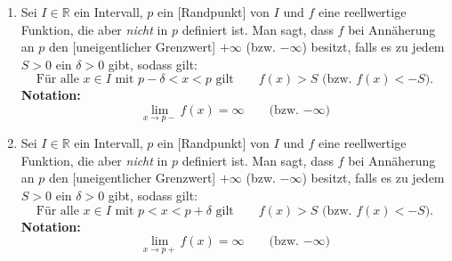 \begin{enumerate}[leftmargin=*]
    \item Sei $I \in \mathbb{R}$ ein Intervall, $p$ ein [Randpunkt] von $I$ und $f$ eine reellwertige Funktion, die aber \textit{nicht} in $p$ definiert ist. Man sagt, dass $f$ bei Annäherung an $p$ den [uneigentlicher Grenzwert] $+\infty$ (bzw. $-\infty$) besitzt, falls es zu jedem $S > 0$ ein $\delta > 0$ gibt, sodass gilt:
    $$\text{Für alle $x \in I$ mit $p - \delta  < x < p$ gilt} \qquad f(x) > S \text{ (bzw. $f(x) < -S$).}$$
    \textbf{Notation:} $$\lim_{x \to p-} f(x) = \infty \qquad \text{(bzw. $-\infty$)}$$
    \item Sei $I \in \mathbb{R}$ ein Intervall, $p$ ein [Randpunkt] von $I$ und $f$ eine reellwertige Funktion, die aber \textit{nicht} in $p$ definiert ist. Man sagt, dass $f$ bei Annäherung an $p$ den [uneigentlicher Grenzwert] $+\infty$ (bzw. $-\infty$) besitzt, falls es zu jedem $S > 0$ ein $\delta > 0$ gibt, sodass gilt:
    $$\text{Für alle $x \in I$ mit $p < x < p + \delta$ gilt} \qquad f(x) > S \text{ (bzw. $f(x) < -S$).}$$
    \textbf{Notation:} $$\lim_{x \to p+} f(x) = \infty \qquad \text{(bzw. $-\infty$)}$$
\end{enumerate}